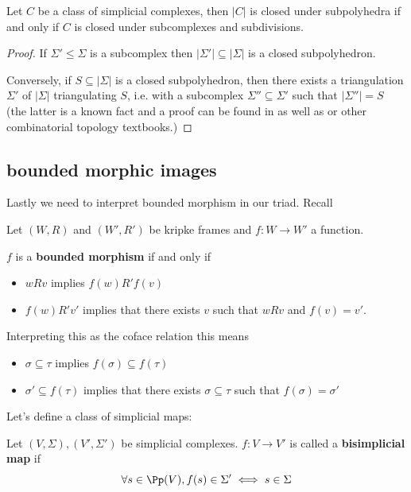 \begin{lemma}
    Let $C$ be a class of simplicial complexes, then $|C|$ is closed under subpolyhedra if and only if 
    $C$ is closed under subcomplexes and subdivisions.
\end{lemma}
\begin{proof}
    If $\Sigma'\leq \Sigma$ is a subcomplex then $|\Sigma'|\subseteq |\Sigma|$ is a closed subpolyhedron.

    Conversely, if $S\subseteq |\Sigma|$ is a closed subpolyhedron, then there exists a triangulation $\Sigma'$ of $|\Sigma|$
    triangulating $S$, i.e. with a subcomplex $\Sigma''\subseteq \Sigma'$ such that $|\Sigma''|=S$ (the latter is a known fact and a 
    proof can be found in \cite{DBLP} as well as \cite{PLTopology} or other combinatorial topology textbooks.)
\end{proof}

\subsection{bounded morphic images}

Lastly we need to interpret bounded morphism in our triad. Recall 
\begin{definition}\hfill 

    Let $(W,R)$ and $(W',R')$ be kripke frames and $f:W\to W'$ a function.

    $f$ is a \textbf{bounded morphism} if and only if 
    \begin{itemize}
        \item $wRv$ implies $f(w)R'f(v)$
        \item $f(w)R' v'$ implies that there exists $v$ such that $wRv$ and $f(v)=v'$.
    \end{itemize}
\end{definition}

Interpreting this as the coface relation this means 
\begin{itemize}
    \item $\sigma\subseteq \tau$ implies $f(\sigma)\subseteq f(\tau)$
    \item $\sigma'\subseteq f(\tau)$ implies that there exists $\sigma\subseteq \tau$ such that $f(\sigma)=\sigma'$
\end{itemize}

Let's define a class of simplicial maps:
\begin{definition}\hfill 
    
    Let $(V,\Sigma),(V',\Sigma')$ be simplicial complexes. $f:V\to V'$ is called a \textbf{bisimplicial map} if 
    \[\forall s\in \Pp(V), f(s)\in \Sigma' \iff s\in \Sigma\]
\end{definition}

